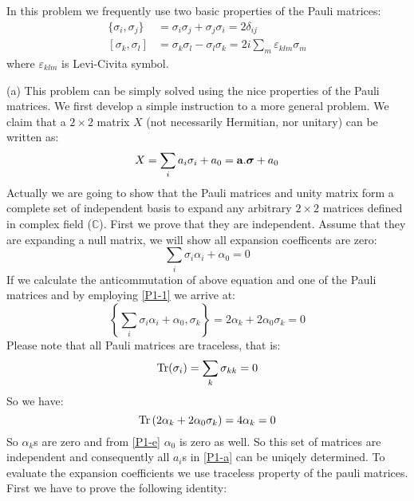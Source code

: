 \begin{homeworkProblem}
In this problem we frequently use two basic properties of the Pauli matrices:
\begin{align}
\{\sigma_i,\sigma_j\}&=\sigma_i\sigma_j+\sigma_j\sigma_i=2\delta_{ij}\label{P1-1}\\
[\sigma_k,\sigma_l]&=\sigma_k\sigma_l-\sigma_l\sigma_k=2i\sum_m\varepsilon_{klm}\sigma_m \label{P1-2}
\end{align}
where $\varepsilon_{klm}$ is Levi-Civita symbol. 
\begin{homeworkSection}{(a)}
This problem can be simply solved using the nice properties of the Pauli matrices. We first develop a simple instruction to a more general problem. We claim that a $2\times 2$ matrix $X$ (not necessarily Hermitian, nor unitary) can be written as:
\begin{equation}\label{P1-a}
X=\sum_{i}a_i\sigma_i+a_0=\mathbf{a}.\boldsymbol{\sigma}+a_0
\end{equation} 
Actually we are going to show that the Pauli matrices and unity matrix form a complete set of independent basis to expand any arbitrary $2\times 2$ matrices defined in complex field ($\mathbb{C}$). First we prove that they are independent. Assume that they are expanding a null matrix, we will show all expansion coefficents are zero:
\begin{equation}
\sum_i\sigma_i\alpha_i+\alpha_0=0
\end{equation}     
If we calculate the anticommutation of above equation and one of the Pauli matrices and by employing \eqref{P1-1} we arrive at:
\begin{equation}\label{P1-e}
\left\{\sum_i\sigma_i\alpha_i+\alpha_0,\sigma_k\right\}=2\alpha_k+2\alpha_0\sigma_k=0
\end{equation}
Please note that all Pauli matrices are traceless, that is:
\begin{equation}\label{P1-tr}
\operatorname{Tr}(\sigma_i)=\sum_k\sigma_{kk}=0
\end{equation}
So we have:
\begin{equation}
\operatorname{Tr}\left(2\alpha_k+2\alpha_0\sigma_k\right)=4\alpha_k=0
\end{equation}
So $\alpha_k$s are zero and from \eqref{P1-e} $\alpha_0$ is zero as well. So this set of matrices are independent and consequently all $a_i$s in \eqref{P1-a} can be uniqely determined. To evaluate the expansion coefficients we use traceless property of the pauli matrices. First we have to prove the following identity:

\end{homeworkSection}
\end{homeworkProblem}
